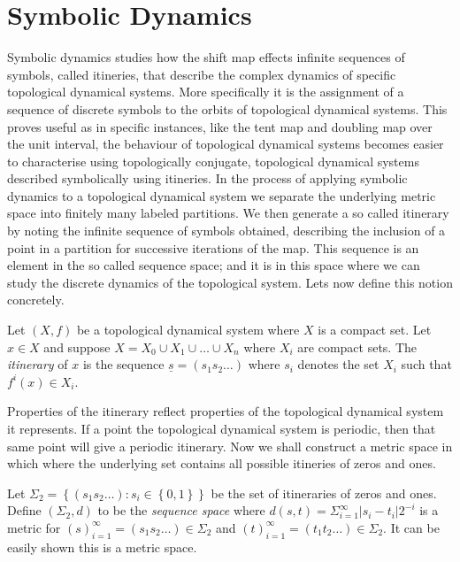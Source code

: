 \section{Symbolic Dynamics} \label{sec:symbolic-dynamics}
Symbolic dynamics studies how the shift map effects infinite sequences of symbols, called itineries, that describe the complex dynamics of specific topological dynamical systems. More specifically it is the assignment of a sequence of discrete symbols to the orbits of topological dynamical systems. This proves useful as in specific instances, like the tent map and doubling map over the unit interval, the behaviour of topological dynamical systems becomes easier to characterise using topologically conjugate, topological dynamical systems described symbolically using itineries. In the process of applying symbolic dynamics to a topological dynamical system we separate the underlying metric space into finitely many labeled partitions. We then generate a so called itinerary by noting the infinite sequence of symbols obtained, describing the inclusion of a point in a partition for successive iterations of the map. This sequence is an element in the so called sequence space; and it is in this space where we can study the discrete dynamics of the topological system. Lets now define this notion concretely.

\begin{defn}[Itinerary] \label{defn:itinerary}
    Let $(X, f)$ be a topological dynamical system where $X$ is a compact set. Let $x \in X$ and suppose $X = X_0 \cup X_1 \cup \dots \cup X_n$ where $X_i$ are compact sets. The \emph{itinerary} of $x$ is the sequence $\underline{s} = (s_1s_2\dots)$ where $s_i$ denotes the set $X_i$ such that $f^i(x) \in X_i$.
\end{defn}

Properties of the itinerary reflect properties of the topological dynamical system it represents. If a point the topological dynamical system is periodic, then that same point will give a periodic itinerary. Now we shall construct a metric space in which where the underlying set contains all possible itineries of zeros and ones.

\begin{defn} \label{defn:sequence-space}
    Let $\Sigma_2 = \left\lbrace (s_1s_2\dots): s_i \in \left\lbrace 0, 1 \right\rbrace \right\rbrace$ be the set of itineraries of zeros and ones. Define $(\Sigma_2, d)$ to be the \emph{sequence space} where $d(s, t) = \Sigma_{i=1}^{\infty}|s_i - t_i|2^{-i}$ is a metric for $(s)_{i=1}^{\infty} = (s_1s_2\dots) \in \Sigma_2$ and $(t)_{i=1}^{\infty} = (t_1t_2\dots) \in \Sigma_2$. It can be easily shown this is a metric space.
\end{defn}


